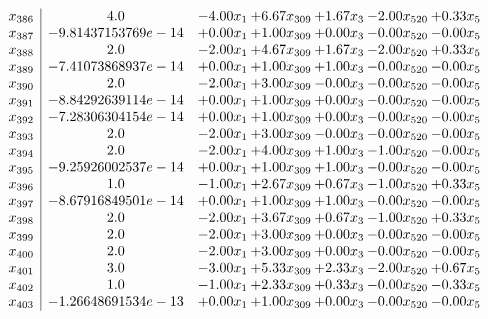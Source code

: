 \documentclass[8pt]{article}
\begin{document}
\[\begin{array}{c| c c@{\hskip 2pt} c@{\hskip 2pt} c@{\hskip 2pt} c@{\hskip 2pt} c@{\hskip 2pt} }
 x_{386}   &  4.0 & -4.00 x_{1} & +  6.67 x_{309} & +  1.67 x_{3} & -2.00 x_{520} & +  0.33 x_{5}\\
 x_{387}   &  -9.81437153769e-14 & +  0.00 x_{1} & +  1.00 x_{309} & +  0.00 x_{3} & -0.00 x_{520} & -0.00 x_{5}\\
 x_{388}   &  2.0 & -2.00 x_{1} & +  4.67 x_{309} & +  1.67 x_{3} & -2.00 x_{520} & +  0.33 x_{5}\\
 x_{389}   &  -7.41073868937e-14 & +  0.00 x_{1} & +  1.00 x_{309} & +  1.00 x_{3} & -0.00 x_{520} & -0.00 x_{5}\\
 x_{390}   &  2.0 & -2.00 x_{1} & +  3.00 x_{309} & -0.00 x_{3} & -0.00 x_{520} & -0.00 x_{5}\\
 x_{391}   &  -8.84292639114e-14 & +  0.00 x_{1} & +  1.00 x_{309} & +  0.00 x_{3} & -0.00 x_{520} & -0.00 x_{5}\\
 x_{392}   &  -7.28306304154e-14 & +  0.00 x_{1} & +  1.00 x_{309} & +  0.00 x_{3} & -0.00 x_{520} & -0.00 x_{5}\\
 x_{393}   &  2.0 & -2.00 x_{1} & +  3.00 x_{309} & -0.00 x_{3} & -0.00 x_{520} & -0.00 x_{5}\\
 x_{394}   &  2.0 & -2.00 x_{1} & +  4.00 x_{309} & +  1.00 x_{3} & -1.00 x_{520} & -0.00 x_{5}\\
 x_{395}   &  -9.25926002537e-14 & +  0.00 x_{1} & +  1.00 x_{309} & +  1.00 x_{3} & -0.00 x_{520} & -0.00 x_{5}\\
 x_{396}   &  1.0 & -1.00 x_{1} & +  2.67 x_{309} & +  0.67 x_{3} & -1.00 x_{520} & +  0.33 x_{5}\\
 x_{397}   &  -8.67916849501e-14 & +  0.00 x_{1} & +  1.00 x_{309} & +  1.00 x_{3} & -0.00 x_{520} & -0.00 x_{5}\\
 x_{398}   &  2.0 & -2.00 x_{1} & +  3.67 x_{309} & +  0.67 x_{3} & -1.00 x_{520} & +  0.33 x_{5}\\
 x_{399}   &  2.0 & -2.00 x_{1} & +  3.00 x_{309} & +  0.00 x_{3} & -0.00 x_{520} & -0.00 x_{5}\\
 x_{400}   &  2.0 & -2.00 x_{1} & +  3.00 x_{309} & +  0.00 x_{3} & -0.00 x_{520} & -0.00 x_{5}\\
 x_{401}   &  3.0 & -3.00 x_{1} & +  5.33 x_{309} & +  2.33 x_{3} & -2.00 x_{520} & +  0.67 x_{5}\\
 x_{402}   &  1.0 & -1.00 x_{1} & +  2.33 x_{309} & +  0.33 x_{3} & -0.00 x_{520} & -0.33 x_{5}\\
 x_{403}   &  -1.26648691534e-13 & +  0.00 x_{1} & +  1.00 x_{309} & +  0.00 x_{3} & -0.00 x_{520} & -0.00 x_{5}\\

\end{array}\]
\end{document}
